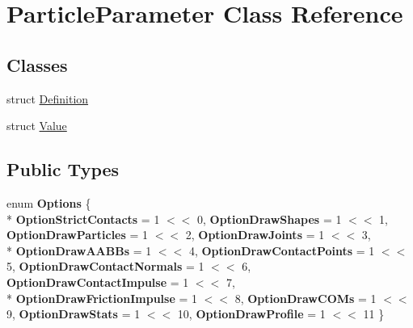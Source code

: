 \hypertarget{classParticleParameter}{\section{Particle\-Parameter Class Reference}
\label{classParticleParameter}
}
\subsection*{Classes}
\begin{DoxyCompactItemize}
\item 
struct \hyperlink{structParticleParameter_1_1Definition}{Definition}
\item 
struct \hyperlink{structParticleParameter_1_1Value}{Value}
\end{DoxyCompactItemize}
\subsection*{Public Types}
\begin{DoxyCompactItemize}
\item 
enum {\bfseries Options} \{ \\*
{\bfseries Option\-Strict\-Contacts} = 1 $<$$<$ 0, 
{\bfseries Option\-Draw\-Shapes} = 1 $<$$<$ 1, 
{\bfseries Option\-Draw\-Particles} = 1 $<$$<$ 2, 
{\bfseries Option\-Draw\-Joints} = 1 $<$$<$ 3, 
\\*
{\bfseries Option\-Draw\-A\-A\-B\-Bs} = 1 $<$$<$ 4, 
{\bfseries Option\-Draw\-Contact\-Points} = 1 $<$$<$ 5, 
{\bfseries Option\-Draw\-Contact\-Normals} = 1 $<$$<$ 6, 
{\bfseries Option\-Draw\-Contact\-Impulse} = 1 $<$$<$ 7, 
\\*
{\bfseries Option\-Draw\-Friction\-Impulse} = 1 $<$$<$ 8, 
{\bfseries Option\-Draw\-C\-O\-Ms} = 1 $<$$<$ 9, 
{\bfseries Option\-Draw\-Stats} = 1 $<$$<$ 10, 
{\bfseries Option\-Draw\-Profile} = 1 $<$$<$ 11
 \}
\end{DoxyCompactItemize}
